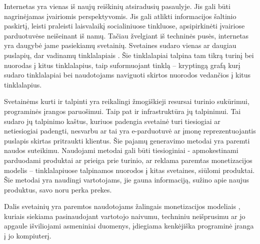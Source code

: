 Internetas yra vienas iš naujų reiškinių atsiradusių pasaulyje. Jis gali būti nagrinėjamas įvairiomis perspektyvomis. Jis gali atlikti informacijos šaltinio paskirtį, leisti praleisti laisvalaikį socialiniuose tinkluose, apsipirkinėti įvairiose parduotuvėse neišeinant iš namų.  Tačiau žvelgiant iš techninės pusės, internetas yra daugybė jame pasiekiamų svetainių. Svetaines sudaro vienas ar daugiau puslapių, dar vadinamų tinklalapiais . Šie tinklalapiai talpina tam tikrą turinį bei nuorodas į kitus tinklalapius, taip suformuojant tinklą -- kryptingą grafą kurį sudaro tinklalapiai bei naudotojams naviguoti skirtos nuorodos vedančios į kitus tinklalapius.

Svetainėms kurti ir talpinti yra reikalingi žmogiškieji resursai turinio sukūrimui, programinės įrangos paruošimui. Taip pat ir infrastruktūra jų talpinimui. Tai sudaro jų talpinimo kaštus, kuriuos padengia svetainė turi tiesiogiai ar netiesiogiai padengti, nesvarbu ar tai yra e-parduotuvė ar įmonę reprezentuojantis puslapis skirtas pritraukti klientus. Šie pajamų generavimo metodai yra paremti naudos suteikimu. Naudojami metodai gali būti tiesioginiai - apmokestinami parduodami produktai ar prieiga prie turinio, ar reklama paremtas monetizacijos modelis -- tinklalapiuose talpinamos nuorodos į kitas svetaines, siūlomi produktai. Šie metodai yra naudingi vartotojams, jie gauna informaciją, sužino apie naujus produktus, savo noru perka prekes.

Dalis svetainių yra paremtos naudotojams žalingais monetizacijos modeliais \cite{tax}, kuriais siekiama pasinaudojant vartotojo naivumu, techniniu neišprusimu ar jo apgaule išviliojami asmeniniai duomenys, įdiegiama kenkėjiška programinė įranga į jo kompiuterį.
